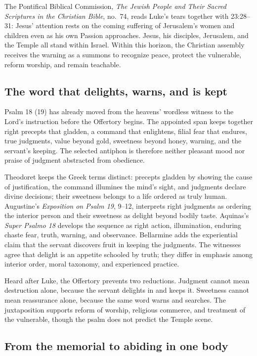The Pontifical Biblical Commission, \emph{The Jewish People and Their Sacred Scriptures in the Christian Bible}, no.~74, reads Luke's tears together with 23:28--31: Jesus' attention rests on the coming suffering of Jerusalem's women and children even as his own Passion approaches. Jesus, his disciples, Jerusalem, and the Temple all stand within Israel. Within this horizon, the Christian assembly receives the warning as a summons to recognize peace, protect the vulnerable, reform worship, and remain teachable.

\sectionguard
\subsection*{The word that delights, warns, and is kept\enspace{}}

Psalm 18 (19) has already moved from the heavens' wordless witness to the Lord's instruction before the Offertory begins. The appointed span keeps together right precepts that gladden, a command that enlightens, filial fear that endures, true judgments, value beyond gold, sweetness beyond honey, warning, and the servant's keeping. The selected antiphon is therefore neither pleasant mood nor praise of judgment abstracted from obedience.

Theodoret keeps the Greek terms distinct: precepts gladden by showing the cause of justification, the command illumines the mind's sight, and judgments declare divine decisions; their sweetness belongs to a life ordered as truly human. Augustine's \emph{Exposition on Psalm 19}, 9--12, interprets right judgments as ordering the interior person and their sweetness as delight beyond bodily taste. Aquinas's \emph{Super Psalmo 18} develops the sequence as right action, illumination, enduring chaste fear, truth, warning, and observance. Bellarmine adds the experiential claim that the servant discovers fruit in keeping the judgments. The witnesses agree that delight is an appetite schooled by truth; they differ in emphasis among interior order, moral taxonomy, and experienced practice.

Heard after Luke, the Offertory prevents two reductions. Judgment cannot mean destruction alone, because the servant delights in and keeps it. Sweetness cannot mean reassurance alone, because the same word warns and searches. The juxtaposition supports reform of worship, religious commerce, and treatment of the vulnerable, though the psalm does not predict the Temple scene.

\sectionguard
\subsection*{From the memorial to abiding in one body\enspace{}}

